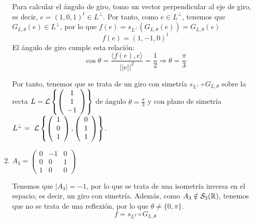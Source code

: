 \begin{ejercicio}
\begin{enumerate}
        Para calcular el ángulo de giro, tomo un vector perpendicular al eje de giro, es decir, $e=(1, 0, 1)^t\in L^\perp$. Por tanto, como $e\in L^\perp$, tenemos que $G_{L,\theta}(e)\in L^\perp$, por lo que $f(e)=s_{L^\perp}(G_{L,\theta}(e))=G_{L,\theta}(e)$
        \begin{equation*}
            f(e)=(1, -1, 0)^t
        \end{equation*}
        El ángulo de giro cumple esta relación:
        \begin{equation*}
            \cos \theta = \frac{\langle f(e),e\rangle}{||e||^2} = \frac{1}{2} \Longrightarrow \theta = \frac{\pi}{3}
        \end{equation*}

        Por tanto, tenemos que se trata de un giro con simetría $s_{L^\perp}\circ G_{L,\theta}$ sobre la recta $L=\mathcal{L}\left\{\left(\begin{array}{c}
                     1 \\ 1 \\ -1
                \end{array}\right)\right\}$ de ángulo $\theta=\frac{\pi}{3}$ y con plano de simetría $L^\perp=~\mathcal{L}\left\{\left(\begin{array}{c}
                     1 \\ 0 \\ 1
                \end{array}\right),
                \left(\begin{array}{c}
                     0 \\ 1 \\ 1
                \end{array}\right)\right\}$.



        \item $A_3=\left(\begin{array}{ccc}
            0 & -1 & 0 \\
            0 & 0 & 1 \\
            1 & 0 & 0
        \end{array}\right)$

        Tenemos que $|A_3|=-1$, por lo que se trata de una isometría inversa en el espacio; es decir, un giro con simetría. Además, como $A_3\notin \mathcal{S}_3(\mathbb{R})$, tenemos que no se trata de una reflexión, por lo que $\theta\neq \{0,\pi\}$.
        \begin{equation*}
            f=s_{L^T} \circ G_{L,\theta}
        \end{equation*}


\end{enumerate}
\end{ejercicio}
